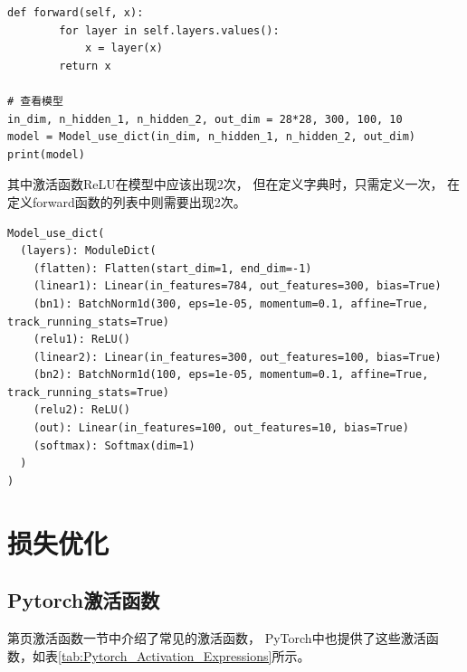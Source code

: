 \begin{enumerate}[label=\arabic*)]
\begin{lstlisting}[style=pythonstyle]
    def forward(self, x):
        for layer in self.layers.values():
            x = layer(x)
        return x
    
# 查看模型
in_dim, n_hidden_1, n_hidden_2, out_dim = 28*28, 300, 100, 10
model = Model_use_dict(in_dim, n_hidden_1, n_hidden_2, out_dim)
print(model)    
\end{lstlisting}
其中激活函数ReLU在模型中应该出现2次，
但在定义字典时，只需定义一次，
在定义forward函数的列表中则需要出现2次。

\begin{lstlisting}[style=demostyle,numbers=none]
Model_use_dict(
  (layers): ModuleDict(
    (flatten): Flatten(start_dim=1, end_dim=-1)
    (linear1): Linear(in_features=784, out_features=300, bias=True)
    (bn1): BatchNorm1d(300, eps=1e-05, momentum=0.1, affine=True, track_running_stats=True)
    (relu1): ReLU()
    (linear2): Linear(in_features=300, out_features=100, bias=True)
    (bn2): BatchNorm1d(100, eps=1e-05, momentum=0.1, affine=True, track_running_stats=True)
    (relu2): ReLU()
    (out): Linear(in_features=100, out_features=10, bias=True)
    (softmax): Softmax(dim=1)
  )
)
\end{lstlisting}            
\end{enumerate}

\section{损失优化}
\label{subsec:Pytorch_loss_optimization}
\subsection{Pytorch激活函数}
\label{subsubsec:Pytorch_nn_functional_activation_function}
第\pageref{subsubsec:激活函数}页激活函数一节中介绍了常见的激活函数，
PyTorch中也提供了这些激活函数，如表\ref{tab:Pytorch_Activation_Expressions}所示。

